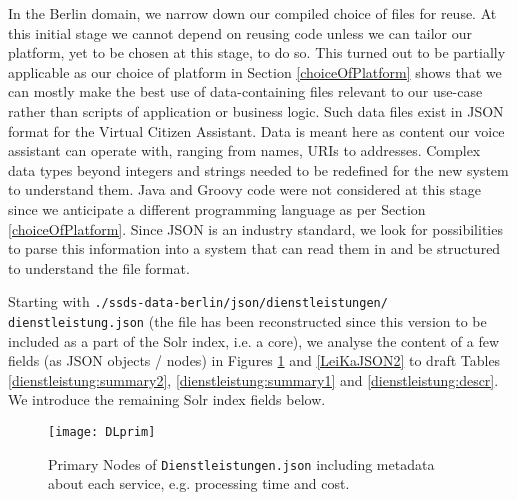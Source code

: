 In the Berlin domain, we narrow down our compiled choice of files for reuse. At this initial stage we cannot depend on reusing code unless we can tailor our platform, yet to be chosen at this stage, to do so. This turned out to be partially applicable as our choice of platform in Section \ref{choiceOfPlatform} shows that we can mostly make the best use of data-containing files relevant to our use-case rather than scripts of application or business logic. Such data files exist in JSON format for the Virtual Citizen Assistant. Data is meant here as %
content our voice assistant can operate with, ranging from names, URIs to addresses. Complex data types beyond integers and strings needed to be redefined for the new system to understand them. 
Java and Groovy code were not considered at this stage since we anticipate a different programming language as per Section \ref{choiceOfPlatform}. Since JSON is an industry standard, we look for possibilities to parse this information into a system that can read them in and be structured to understand the file format. 

Starting with \texttt{./ssds-data-berlin/json/dienstleistungen/} \texttt{dienstleistung.json} (the file has been reconstructed since this version to be included as a part of the Solr index, i.e. a core), we analyse the content of a few fields (as JSON objects / nodes) in Figures \ref{LeiKaJSON1} and \ref{LeiKaJSON2} to draft Tables \ref{dienstleistung:summary2}, \ref{dienstleistung:summary1} and \ref{dienstleistung:descr}. We introduce the remaining Solr index fields below.






%

\begin{figure}[H]
	\caption[File Structure of  \lstinline|Dienstleistungen.json|]{Primary Nodes of \texttt{Dienstleistungen.json} including metadata about each service, e.g. processing time and cost.}
	\label{LeiKaJSON1}
	\texttt{[image: DLprim]}
\end{figure}

